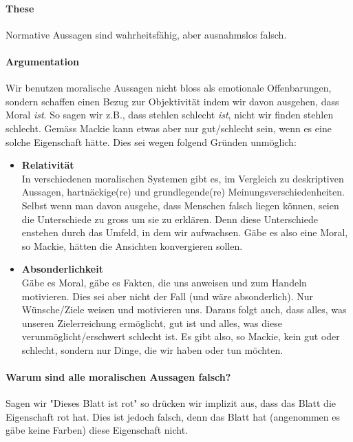 \documentclass[../main.tex]{subfiles}
\begin{document}
\paragraph{These} Normative Aussagen sind wahrheitsfähig, aber ausnahmslos falsch.
\paragraph{Argumentation}
Wir benutzen moralische Aussagen nicht bloss als emotionale Offenbarungen, sondern schaffen einen Bezug zur Objektivität indem wir davon ausgehen, dass Moral \emph{ist}. So sagen wir z.B., dass stehlen schlecht \emph{ist}, nicht wir finden stehlen schlecht. Gemäss Mackie kann etwas aber nur gut/schlecht sein, wenn es eine solche Eigenschaft hätte. Dies sei wegen folgend Gründen unmöglich:
\begin{itemize}
  \item \textbf{Relativität} \\
In verschiedenen moralischen Systemen gibt es, im Vergleich zu deskriptiven Aussagen, hartnäckige(re) und grundlegende(re) Meinungsverschiedenheiten. Selbst wenn man davon ausgehe, dass Menschen falsch liegen können, seien die Unterschiede zu gross um sie zu erklären. Denn diese Unterschiede enstehen durch das Umfeld, in dem wir aufwachsen. Gäbe es also eine Moral, so Mackie, hätten die Ansichten konvergieren sollen.
  \item \textbf{Absonderlichkeit} \\
Gäbe es Moral, gäbe es Fakten, die uns anweisen und zum Handeln motivieren. Dies sei aber nicht der Fall (und wäre absonderlich). Nur Wünsche/Ziele weisen und motivieren uns. Daraus folgt auch, dass alles, was unseren Zielerreichung ermöglicht, gut ist und alles, was diese verunmöglicht/erschwert schlecht ist. Es gibt also, so Mackie, kein gut oder schlecht, sondern nur Dinge, die wir haben oder tun möchten. 
\end{itemize}
\paragraph{Warum sind alle moralischen Aussagen falsch?} Sagen wir "Dieses Blatt ist rot" so drücken wir implizit aus, dass das Blatt die Eigenschaft rot hat. Dies ist jedoch falsch, denn das Blatt hat (angenommen es gäbe keine Farben) diese Eigenschaft nicht. 
\end{document}
